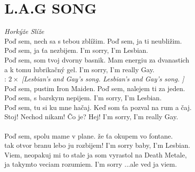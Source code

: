 \section*{\Huge L.A.G SONG}
\emph{Horkýže Slíže}\\

Poď sem, nech sa s tebou zblížim.
Poď sem, ja ti neubližim.\\
Poď sem, ja ťa nezbijem.
I'm sorry, I'm Lesbian.\\

Poď sem, som tvoj dvorny basnik.
Mam energiu za dvanastich\\
a k tomu lubrikačný gel.
I'm sorry, I'm really Gay.\\

\textregistered:
$2\times$ \emph{[Lesbian's and Gay's song. Lesbian's and Gay's song. ]}\\

Poď sem, pustim Iron Maiden.
Poď sem, nalejem ti za jeden.\\
Poď sem, s barskym nepijem.
I'm sorry, I'm Lesbian.\\

Poď sem, tu si ku mne hačaj.
Keď som ťa pozval na rum a čaj.\\
Stoj! Nechod nikam! Čo je? Hej!
I'm sorry, I'm really Gay.\\

\textregistered\\

Poď sem, spolu mame v plane.
že ťa okupem vo fontane.\\
tak otvor branu lebo ju rozbijem!
I'm sorry baby, I'm Lesbian.\\

Viem, neopakuj mi to stale
ja som vyrastol na Death Metale,\\
ja takymto veciam rozumiem.
I'm sorry ...ale ved ja viem.\\

\textregistered \textregistered

\newpage
